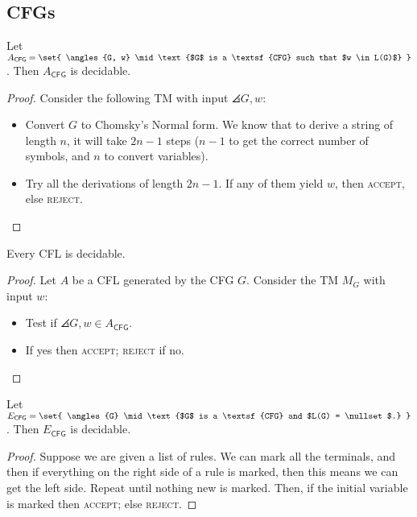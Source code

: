 \documentclass{standalone}
\begin{document}
\subsection{CFGs}
\begin{proposition}
	Let \(A_{\textsf{CFG}} = \set{
		\angles{G, w} \mid \text{$G$ is a \textsf{CFG} such that $w \in L(G)$}
	}\). Then \(A_{\textsf{CFG}}\) is decidable.
\end{proposition}
\begin{proof}
	Consider the following \textsf{TM} with input \(\angles{G, w}\):
	\begin{itemize}
		\item Convert \(G\) to Chomsky's Normal form. We know that to derive a string of length $n$, it will take \(2n - 1\) steps (\(n - 1\) to get the correct number of symbols, and \(n\) to convert variables).
		\item Try all the derivations of length \(2n - 1\). If any of them yield \(w\), then \textsc{accept}, else \textsc{reject}. \qedhere
	\end{itemize}
\end{proof}

\begin{proposition}
	Every \textsf{CFL} is decidable.
\end{proposition}
\begin{proof}
	Let \(A\) be a \textsf{CFL} generated by the \textsf{CFG} \(G\). Consider the \textsf{TM} \(M_G\) with input \(w\):
	\begin{itemize}
		\item Test if \(\angles{G, w} \in A_{\textsf{CFG}}\).
		\item If yes then \textsc{accept}; \textsc{reject} if no. \qedhere
	\end{itemize}
\end{proof}

\begin{proposition}
	Let \(E_{\textsf{CFG}} = \set{
		\angles{G} \mid \text{$G$ is a \textsf{CFG} and $L(G) = \nullset$.}
	}\). Then \(E_{\textsf{CFG}}\) is decidable.
\end{proposition}
\begin{proof}
	Suppose we are given a list of rules. We can mark all the terminals, and then if everything on the right side of a rule is marked, then this means we can get the left side. Repeat until nothing new is marked. Then, if the initial variable is marked then \textsc{accept}; else \textsc{reject}.
\end{proof}
\end{document}
